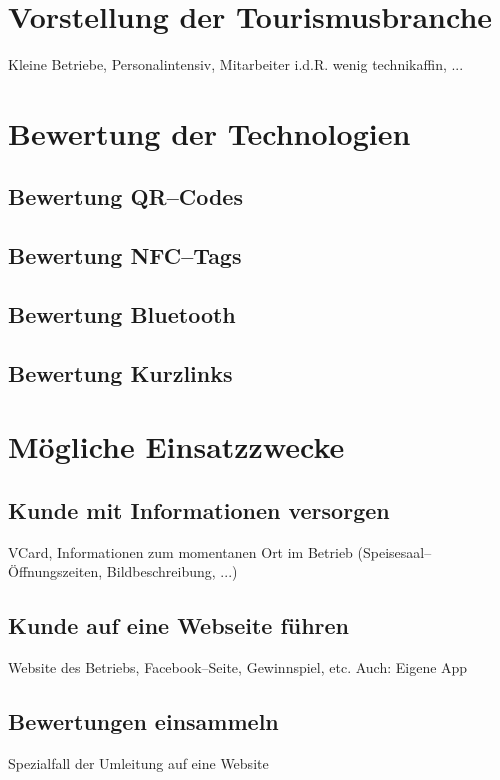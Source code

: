 \section{Vorstellung der Tourismusbranche}
\label{sec:hauptteil}
\label{sec:tourismusbranche}

Kleine Betriebe, Personalintensiv, Mitarbeiter i.d.R. wenig technikaffin, ...

\section{Bewertung der Technologien}
\label{sec:bewertung}

\subsection{Bewertung QR–Codes}
\subsection{Bewertung NFC--Tags}
\subsection{Bewertung Bluetooth}
\subsection{Bewertung Kurzlinks}

\section{Mögliche Einsatzzwecke}
\label{sec:einsatzzwecke}

\subsection{Kunde mit Informationen versorgen}

VCard, Informationen zum momentanen Ort im Betrieb (Speisesaal--Öffnungszeiten, Bildbeschreibung, ...)

\subsection{Kunde auf eine Webseite führen}
Website des Betriebs, Facebook--Seite, Gewinnspiel, etc.
Auch: Eigene App

\subsection{Bewertungen einsammeln}
Spezialfall der Umleitung auf eine Website

